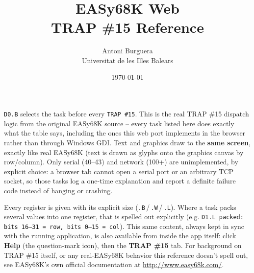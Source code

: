 \documentclass[10pt,a4paper]{article}
\title{\textbf{EASy68K Web}\\[0.3cm]\Large TRAP \#15 Reference}
\author{Antoni Burguera\\\small{Universitat de les Illes Balears}}
\date{\today}
\begin{document}
\maketitle

\begin{tcolorbox}[colback=gray!5!white,colframe=gray!60!black,title=About this reference]
\texttt{D0.B} selects the task before every \texttt{TRAP \#15}. This is the
real TRAP \#15 dispatch logic from the original EASy68K source -- every
task listed here does exactly what the table says, including the ones
this web port implements in the browser rather than through Windows GDI.
Text and graphics draw to the \textbf{same screen}, exactly like real
EASy68K (text is drawn as glyphs onto the graphics canvas by row/column).
Only serial (40--43) and network (100+) are unimplemented, by explicit
choice: a browser tab cannot open a serial port or an arbitrary TCP
socket, so those tasks log a one-time explanation and report a definite
failure code instead of hanging or crashing.

Every register is given with its explicit size (\texttt{.B}\,/\,\texttt{.W}\,/\,\texttt{.L}). Where a task packs several values into one register, that is spelled out explicitly (e.g. \texttt{D1.L packed: bits 16--31 = row, bits 0--15 = col}). This same content, always kept in sync with the running application, is also available from inside the app itself: click \textbf{Help} (the question-mark icon), then the \textbf{TRAP \#15} tab. For background on TRAP \#15 itself, or any real-EASy68K behavior this reference doesn't spell out, see EASy68K's own official documentation at \url{http://www.easy68k.com/}.
\end{tcolorbox}

\tableofcontents
\vspace{0.5cm}


\end{document}
